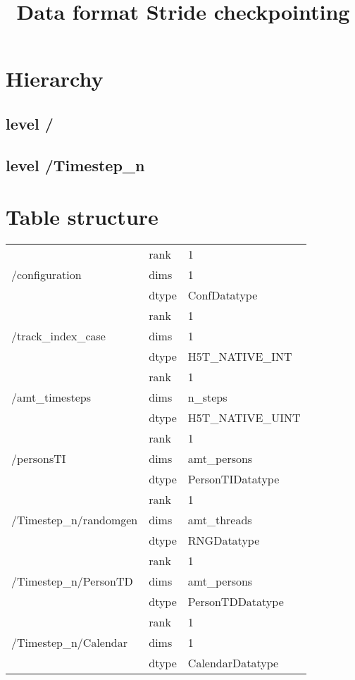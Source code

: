 \documentclass{article}
\title{Data format Stride checkpointing}
\begin{document}
	\maketitle
	\section{Hierarchy}
	\subsection{level /}
	\subsection{level /Timestep\_n}

	\section{Table structure}
		\begin{tabular}{ |l|l|l| }
		\hline

		\multirow{3}{*}{/configuration} 
			& rank & 1 \\
			& dims & 1 \\
			& dtype & ConfDatatype \\ \hline

		\multirow{3}{*}{/track\_index\_case} 
			& rank & 1 \\
			& dims & 1 \\
			& dtype & H5T\_NATIVE\_INT \\ \hline

		\multirow{3}{*}{/amt\_timesteps} 
			& rank & 1 \\
			& dims & n\_steps \\
			& dtype & H5T\_NATIVE\_UINT \\ \hline
		
		\multirow{3}{*}{/personsTI} 
			& rank & 1 \\
			& dims & amt\_persons \\
			& dtype & PersonTIDatatype \\ \hline

		\multirow{3}{*}{/Timestep\_n/randomgen} 
			& rank & 1 \\
			& dims & amt\_threads \\
			& dtype & RNGDatatype \\ \hline

		\multirow{3}{*}{/Timestep\_n/PersonTD} 
			& rank & 1 \\
			& dims & amt\_persons \\
			& dtype & PersonTDDatatype \\ \hline

		\multirow{3}{*}{/Timestep\_n/Calendar} 
			& rank & 1 \\
			& dims & 1 \\
			& dtype & CalendarDatatype \\ \hline
		\end{tabular}
		\newpage
\end{document}
